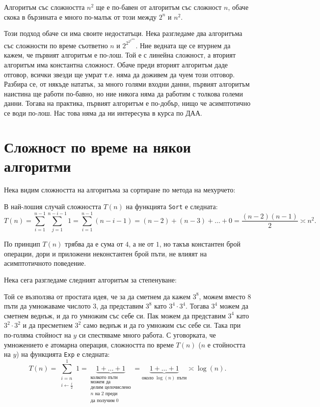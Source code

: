 Алгоритъм със сложността $n^2$ ще е по-бавен от алгоритъм със сложност $n$, обаче скока в бързината е много по-малък от този между $2^n$ и $n^2$.

Този подход обаче си има своите недостатъци.
Нека разгледаме два алгоритъма със сложности по време съответно $n$ и $2^{2^{2^{2^{1024}}}}$.
Ние ведната ще се втурнем да кажем, че първият алгоритъм е по-лош.
Той е с линейна сложност, а вторият алгоритъм има константна сложност.
Обаче преди вторият алгоритъм даде отговор, всички звезди ще умрат т.е. няма да доживем да чуем този отговор.
Разбира се, от някъде нататък, за много голями входни данни, първият алгоритъм наистина ще работи по-бавно, но ние никога няма да работим с толкова големи данни.
Тогава на практика, първият алгоритъм е по-добър, нищо че асимптотично се води по-лош.
Нас това няма да ни интересува в курса по ДАА.

\section{Сложност по време на някои алгоритми}

Нека видим сложността на алгоритъма за сортиране по метода на мехурчето:


В най-лошия случай сложността $T(n)$ на функцията {\tt Sort} е следната:
\[
  T(n) = \sum\limits_{i = 1}^{n - 1} \sum\limits_{j = 1}^{n - i - 1} 1 = \sum\limits_{i = 1}^{n - 1} (n - i - 1) = (n - 2) + (n - 3) + \dots + 0 = \frac{(n - 2)(n - 1)}{2} \asymp n^2.
\]

По принцип $T(n)$ трябва да е сума от $4$, а не от $1$, но такъв константен брой операции, дори и приложени неконстантен брой пъти, не влияят на асимптотичното поведение.

Нека сега разгледаме следният алгоритъм за степенуване:


Той се възползва от простата идея, че за да сметнем да кажем $3^8$, можем вместо $8$ пъти да умножаваме числото $3$, да представим $3^8$ като $3^4 \cdot 3^4$.
Тогава $3^4$ можем да сметнем веднъж, и да го умножим със себе си.
Пак можем да представим $3^4$ като $3^2 \cdot 3^2$ и да пресметнем $3^2$ само веднъж и да го умножим със себе си.
Така при по-голяма стойност на $y$ си спестяваме много работа.
С уговорката, че умножението е атомарна операция, сложността по време $T(n)$ ($n$ е стойността на $y$) на функцията {\tt Exp} е следната:
\[
  T(n) = \sum\limits_{\substack{i = n \\ i \leftarrow \frac{i}{2}}}^1 1 = \underbrace{1 + \dots + 1}_{\substack{\text{колкото пъти} \\\text{можем да} \\ \text{делим целочислено} \\ n \text{ на } 2 \text{ преди} \\ \text{да получим } 0}} = \underbrace{1 + \dots + 1}_{\text{около } \log(n) \text{ пъти}} \asymp \log(n).
\]

